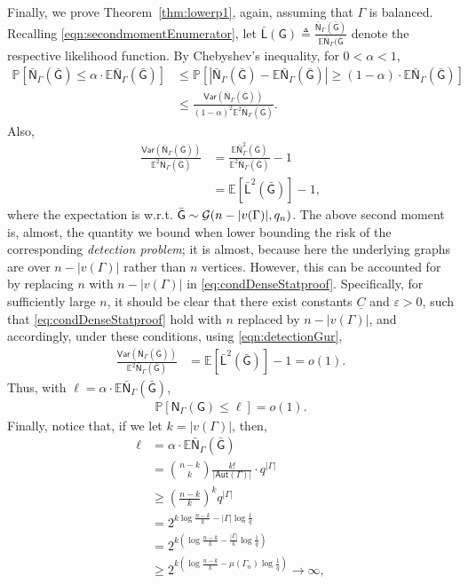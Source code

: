 \documentclass[12pt]{article}
\newcommand{\bE}{\mathbb{E}}
\newcommand{\abs}[1]{\left|#1\right|}
\newcommand {\pr} {\mathbb{P}}
\newcommand{\calG}{{\cal G}}
\newcommand{\p}[1]{\left(#1\right)}
\newcommand{\pp}[1]{\left[#1\right]}
\newcommand{\s}[1]{\mathsf{#1}}
\begin{document}
Finally, we prove Theorem~\ref{thm:lowerp1}, again, assuming that $\Gamma$ is balanced. Recalling \eqref{eqn:secondmomentEnumerator}, let $\bar{\s{L}}(\s{G})\triangleq\frac{\bar{\s{N}}_{\Gamma}(\bar{\s{G}})}{\bE\bar{\s{N}}_{\Gamma}(\bar{\s{G}}}$ denote the respective likelihood function. By Chebyshev's inequality, for $0<\alpha<1$,
\begin{align}
    \pr\pp{\bar{\s{N}}_{\Gamma}(\bar{\s{G}})\leq\alpha\cdot\bE\bar{\s{N}}_{\Gamma}(\bar{\s{G}})}&\leq \pr\pp{\abs{\bar{\s{N}}_{\Gamma}(\bar{\s{G}})-\bE\bar{\s{N}}_{\Gamma}(\bar{\s{G}})}\geq(1-\alpha)\cdot\bE\bar{\s{N}}_{\Gamma}(\bar{\s{G}})}\\
    &\leq\frac{\s{Var}\p{\bar{\s{N}}_{\Gamma}(\bar{\s{G}})}}{(1-\alpha)^2\bE^2\bar{\s{N}}_{\Gamma}(\bar{\s{G}})}.
\end{align}
Also,
\begin{align}
    \frac{\s{Var}\p{\bar{\s{N}}_{\Gamma}(\bar{\s{G}})}}{\bE^2\bar{\s{N}}_{\Gamma}(\bar{\s{G}})} &= \frac{\bE\bar{\s{N}}^2_{\Gamma}(\bar{\s{G}})}{\bE^2\bar{\s{N}}_{\Gamma}(\bar{\s{G}})}-1\\
    & = \bE[\bar{\s{L}}^2(\bar{\s{G}})]-1,
\end{align}
where the expectation is w.r.t. $\bar{\s{G}}\sim\calG(n-|v(\Gamma)|,q_n)$. The above second moment is, almost, the quantity we bound when lower bounding the risk of the corresponding \emph{detection problem}; it is almost, because here the underlying graphs are over $n-|v(\Gamma)|$ rather than $n$ vertices. However, this can be accounted for by replacing $n$ with $n-|v(\Gamma)|$ in \eqref{eq:condDenseStatproof}. Specifically, for sufficiently large $n$, it should be clear that there exist constants $\underline{C}$ and $\varepsilon>0$, such that \eqref{eq:condDenseStatproof} hold with $n$ replaced by $n-|v(\Gamma)|$, and accordingly, under these conditions, using \eqref{eqn:detectionGur},
\begin{align}
    \frac{\s{Var}\p{\bar{\s{N}}_{\Gamma}(\bar{\s{G}})}}{\bE^2\bar{\s{N}}_{\Gamma}(\bar{\s{G}})} &=\bE[\bar{\s{L}}^2(\bar{\s{G}})]-1=o(1).
\end{align}
Thus, with $\ell =  \alpha\cdot\bE\bar{\s{N}}_{\Gamma}(\bar{\s{G}})$,
\begin{align}
    \pr\pp{\s{N}_{\Gamma}(\s{G})\leq\ell}=o(1).
\end{align}
Finally, notice that, if we let $k=|v(\Gamma)|$, then,
\begin{align}
    \ell &= \alpha\cdot\bE\bar{\s{N}}_{\Gamma}(\bar{\s{G}}) \\
    &= \binom{n-k}{k}\frac{k!}{|\s{Aut}(\Gamma)|}\cdot q^{|\Gamma|}\\
    &\geq \p{\frac{n-k}{k}}^kq^{|\Gamma|}\\
    & = 2^{k\log\frac{n-k}{k}-|\Gamma|\log\frac{1}{q}}\\
    & = 2^{k\p{\log\frac{n-k}{k}-\frac{|\Gamma|}{k}\log\frac{1}{q}}}\\
    & \geq 2^{k\p{\log\frac{n-k}{k}-\mu(\Gamma_n)\log\frac{1}{q}}}\to\infty,
\end{align}
\end{document}
